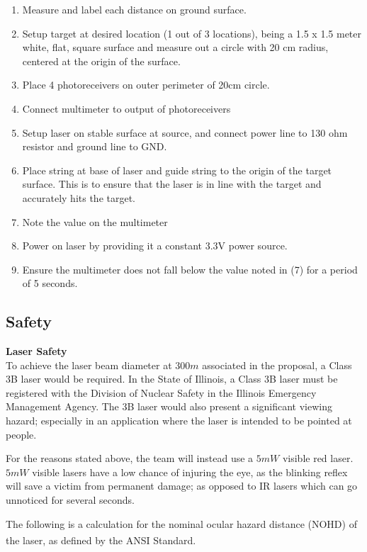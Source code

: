 \documentclass[letterpaper,10pt]{article}
\begin{document}
\begin{spacing}{1.15}
\begin{enumerate}
	\item Measure and label each distance on ground surface.
	\item Setup target at desired location (1 out of 3 locations), being a 1.5 x 1.5 meter white, flat, square surface and measure out a circle with 20 cm radius, centered at the origin of the surface.
	\item Place 4 photoreceivers on outer perimeter of 20cm circle.
	\item Connect multimeter to output of photoreceivers
	\item Setup laser on stable surface at source, and connect power line to 130 ohm resistor and ground line to GND.
	\item Place string at base of laser and guide string to the origin of the target surface. This is to ensure that the laser is in line with the target and accurately hits the target.
	\item Note the value on the multimeter
	\item Power on laser by providing it a constant 3.3V power source.
	\item Ensure the multimeter does not fall below the value noted in (7) for a period of 5 seconds. 
\end{enumerate}

\subsection{Safety} \label{section-safety-ethics}
\normalsize\textbf{Laser Safety} \\
To achieve the laser beam diameter at $300 m$ associated in the proposal, a Class 3B laser would be required. In the State of Illinois, a Class 3B laser must be registered with the Division of Nuclear Safety in the Illinois Emergency Management Agency. The 3B laser would also present a significant viewing hazard; especially in an application where the laser is intended to be pointed at people. 

For the reasons stated above, the team will instead use a $5mW$ visible red laser. $5mW$ visible lasers have a low chance of injuring the eye, as the blinking reflex will save a victim from permanent damage; as opposed to IR lasers which can go unnoticed for several seconds. 

The following is a calculation for the nominal ocular hazard distance (NOHD) of the laser, as defined by the ANSI Standard\textsuperscript{\cite{ANSI}}.


\end{spacing}
\end{document}
